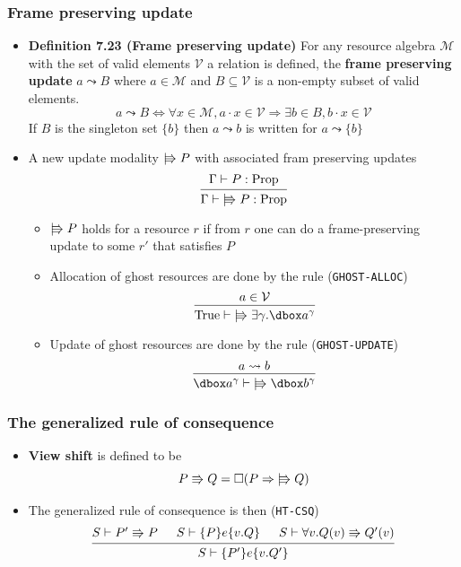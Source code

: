 \subsubsection{Frame preserving update}
\begin{itemize}
  \item \textbf{Definition 7.23 (Frame preserving update)} For any resource algebra $\mathcal M$ with the set of valid elements $\mathcal V$ a relation is defined, the \textbf{frame preserving update} $a \leadsto B$ where $a \in \mathcal M$ and $B \subseteq \mathcal V$ is a non-empty subset of valid elements.
    \[	
    a \leadsto B \Longleftrightarrow \forall x \in \mathcal{M}, a \cdot x \in \mathcal{V} \Rightarrow \exists b \in B, b \cdot x \in \mathcal{V}
    \]	
  If $B$ is the singleton set $\{b\}$ then $a \leadsto b$ is written for $a \leadsto \{b\}$
  \item A new update modality $\upd P$ with associated fram preserving updates
  \[
  \begin{prooftree} 
    \hypo{\Gamma \vdash P: \text{Prop}} 
    \infer1{\Gamma \vdash \upd P: \text{Prop}} 
  \end{prooftree}
  \]
  \begin{itemize}
  	\item $\upd P$ holds for a resource $r$ if from $r$ one can do a frame-preserving update to some $r'$ that satisfies $P$
    \item Allocation of ghost resources are done by the rule (\texttt{GHOST-ALLOC})
    \[
    \begin{prooftree} 
      \hypo{a \in \mathcal V}
      \infer1{\text{True} \vdash \upd \exists \gamma. \dboxed{a}^\gamma}
    \end{prooftree}
    \]
    \item Update of ghost resources are done by the rule (\texttt{GHOST-UPDATE})
    \[
    \begin{prooftree} 
      \hypo{a \leadsto b}
      \infer1{\dboxed{a}^\gamma \vdash \upd \dboxed{b}^\gamma}
    \end{prooftree}
    \]
  \end{itemize}
\end{itemize}

\subsubsection{The generalized rule of consequence}
\begin{itemize}
	\item \textbf{View shift} is defined to be 
  \[
    P \Rrightarrow Q = \square (P \Rightarrow \upd Q)
  \]
  \item The generalized rule of consequence is then (\texttt{HT-CSQ})
  \[
  \begin{prooftree} 
    \hypo{S \vdash P' \Rrightarrow P}
    \hypo{S \vdash \{P\} e \{v.Q\}}
    \hypo{S \vdash \forall v. Q(v) \Rrightarrow Q'(v)}
    \infer3{S \vdash \{P'\} e \{v.Q'\}}
  \end{prooftree}
  \]

\end{itemize}

